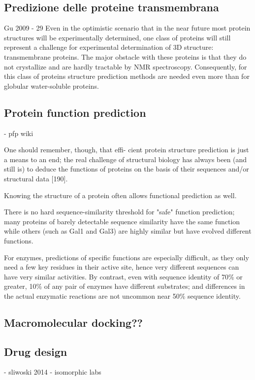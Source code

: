 \subsection{Predizione delle proteine transmembrana}

Gu 2009 - 29
 Even in the optimistic scenario that in the near future most
protein structures will be experimentally determined, one class of proteins
will still represent a challenge for experimental determination of 3D
structure: transmembrane proteins. The major obstacle with these proteins
is that they do not crystallize and are hardly tractable by NMR
spectroscopy. Consequently, for this class of proteins structure prediction
methods are needed even more than for globular water-soluble proteins.

\subsection{Protein function prediction}
- pfp wiki

One should remember, though, that effi-
cient protein structure prediction is just a means to an end; the real challenge of structural
biology has always been (and still is) to deduce the functions of proteins on the basis of their
sequences and/or structural data [190].

Knowing the structure of a protein often allows functional prediction as well.

There is no hard sequence-similarity threshold for "safe" function prediction; many proteins of barely
detectable sequence similarity have the same function while others (such as Gal1 and Gal3) are highly
similar but have evolved different functions. 

For enzymes, predictions of specific functions are especially difficult, as they only need a few key residues
in their active site, hence very different sequences can have very similar activities. By contrast, even with
sequence identity of 70\% or greater, 10\% of any pair of enzymes have different substrates; and differences
in the actual enzymatic reactions are not uncommon near 50\% sequence identity.

\subsection{Macromolecular docking??}


\subsection{Drug design}
- sliwoski 2014
- isomorphic labs

